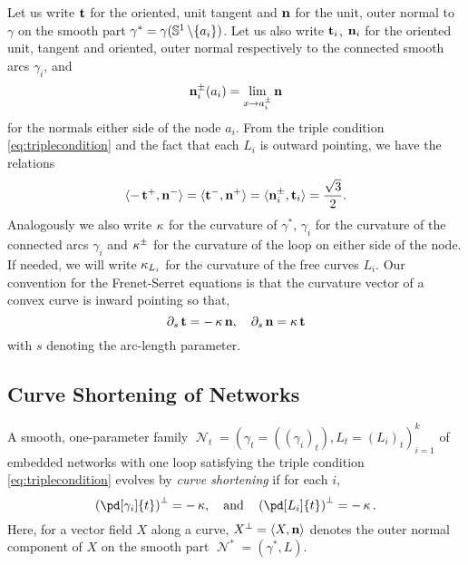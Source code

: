 \documentclass[11pt]{amsart}
\DeclareMathOperator{\network}{\mathcal{N}}
\begin{document}
Let us write \(\operatorname{\mathbf{t}}\) for the oriented, unit tangent and \(\operatorname{\mathbf{n}}\) for the unit, outer normal to \(\gamma\) on the smooth part \(\gamma^{\ast} = \gamma(\mathbb{S}^1\operatorname{\backslash}\{a_i\})\). Let us also write \(\operatorname{\mathbf{t}}_i\), \(\operatorname{\mathbf{n}}_i\) for the oriented unit, tangent and oriented, outer normal respectively to the connected smooth arcs \(\gamma_i\), and
\[
\operatorname{\mathbf{n}}_i^{\pm}(a_i) = \lim_{x\to a_i^{\pm}} \operatorname{\mathbf{n}}
\]
for the normals either side of the node \(a_i\). From the triple condition \eqref{eq:triplecondition} and the fact that each \(L_i\) is outward pointing, we have the relations
\begin{equation}
\label{eq:triplerelations}
\langle{-\operatorname{\mathbf{t}}^+},{\operatorname{\mathbf{n}}^-}\rangle = \langle{\operatorname{\mathbf{t}}^-},{\operatorname{\mathbf{n}}^+}\rangle = \langle{\operatorname{\mathbf{n}}_i^{\pm}},{\operatorname{\mathbf{t}}_i}\rangle = \frac{\sqrt{3}}{2}.
\end{equation}
Analogously we also write \(\operatorname{\kappa}\) for the curvature of \(\gamma^{\ast}\), \(\gamma_i\) for the curvature of the connected arcs \(\gamma_i\) and \(\operatorname{\kappa}^{\pm}\) for the curvature of the loop on either side of the node. If needed, we will write \(\operatorname{\kappa}_{L_i}\) for the curvature of the free curves \(L_i\). Our convention for the Frenet-Serret equations is that the curvature vector of a convex curve is inward pointing so that,
\begin{equation}
\label{eq:frenetserret}
\partial_s \operatorname{\mathbf{t}} = -\operatorname{\kappa} \operatorname{\mathbf{n}}, \quad \partial_s \operatorname{\mathbf{n}} = \operatorname{\kappa} \operatorname{\mathbf{t}}
\end{equation}
with \(s\) denoting the arc-length parameter.

\subsection{Curve Shortening of Networks}
\label{sec:orgheadline3}

\begin{defn}
A smooth, one-parameter family \(\network_t = (\gamma_t = ((\gamma_i)_t), L_t = (L_i)_t)_{i=1}^k\) of embedded networks with one loop satisfying the triple condition \eqref{eq:triplecondition} evolves by \emph{curve shortening} if for each \(i\),
\begin{equation}
\label{eq:csf}
\left(\pd[\gamma_i]{t}\right)^{\perp} = -\curvecurv, \quad \text{and} \quad \left(\pd[L_i]{t}\right)^{\perp} = -\curvecurv.
\end{equation}
Here, for a vector field \(X\) along a curve, \(X^{\perp} = \langle{X},{\operatorname{\mathbf{n}}}\rangle\) denotes the outer normal component of \(X\) on the smooth part \(\network^{\ast} = (\gamma^{\ast}, L)\).
\end{defn}
\end{document}

